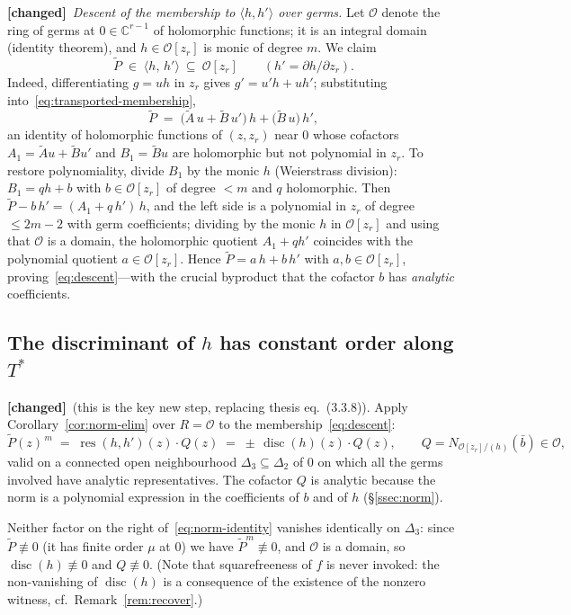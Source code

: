 \documentclass[11pt,a4paper]{article}
\theoremstyle{plain}
\theoremstyle{definition}
\newcommand{\C}{\mathbb{C}}
\DeclareMathOperator{\res}{res}
\DeclareMathOperator{\disc}{disc}
\newcommand{\ideal}[1]{\langle #1\rangle}
\newcommand{\OO}{\mathcal{O}}
\newcommand{\CHANGED}{\textbf{[changed]}}
\begin{document}
\CHANGED\ \emph{Descent of the membership to $\ideal{h,h'}$ over germs.} Let
$\OO$ denote the ring of germs at $0\in\C^{r-1}$ of holomorphic functions; it
is an integral domain (identity theorem), and $h\in\OO[z_r]$ is monic of
degree $m$. We claim
\begin{equation}\label{eq:descent}
  \widetilde P\;\in\;\ideal{h,\,h'}\ \subseteq\ \OO[z_r]
  \qquad(h'=\partial h/\partial z_r).
\end{equation}
Indeed, differentiating $g=uh$ in $z_r$ gives $g'=u'h+uh'$;
substituting into~\eqref{eq:transported-membership},
\[
  \widetilde P
  \;=\;\bigl(\widetilde A\,u+\widetilde B\,u'\bigr)\,h
      +\bigl(\widetilde B\,u\bigr)\,h' ,
\]
an identity of holomorphic functions of $(z,z_r)$ near $0$ whose cofactors
$A_1=\widetilde A u+\widetilde B u'$ and $B_1=\widetilde B u$ are holomorphic
but not polynomial in $z_r$. To restore polynomiality, divide $B_1$ by the
monic $h$ (Weierstrass division): $B_1=qh+b$ with $b\in\OO[z_r]$ of degree
$<m$ and $q$ holomorphic. Then
$\widetilde P-b\,h'=(A_1+q\,h')\,h$, and the left side is a polynomial in
$z_r$ of degree $\le 2m-2$ with germ coefficients; dividing by the monic $h$
in $\OO[z_r]$ and using that $\OO$ is a domain, the holomorphic quotient
$A_1+q h'$ coincides with the polynomial quotient $a\in\OO[z_r]$. Hence
$\widetilde P=a\,h+b\,h'$ with $a,b\in\OO[z_r]$,
proving~\eqref{eq:descent}---with the crucial byproduct that the cofactor $b$
has \emph{analytic} coefficients.

\subsection{The discriminant of $h$ has constant order along $T^*$}
\label{ssec:disc-order}

\CHANGED\ (this is the key new step, replacing thesis eq.~(3.3.8)).
Apply Corollary~\ref{cor:norm-elim} over $R=\OO$ to the
membership~\eqref{eq:descent}:
\begin{equation}\label{eq:norm-identity}
  \widetilde P(z)^{\,m}\;=\;\res(h,h')(z)\cdot Q(z)
  \;=\;\pm\,\disc(h)(z)\cdot Q(z),
  \qquad Q=N_{\OO[z_r]/(h)}(\bar b)\in\OO ,
\end{equation}
valid on a connected open neighbourhood $\Delta_3\subseteq\Delta_2$ of $0$ on
which all the germs involved have analytic representatives. The cofactor $Q$
is analytic because the norm is a polynomial expression in the coefficients of
$b$ and of $h$ (\S\ref{ssec:norm}).

Neither factor on the right of~\eqref{eq:norm-identity} vanishes identically
on $\Delta_3$: since $\widetilde P\not\equiv 0$ (it has finite order $\mu$ at
$0$) we have $\widetilde P^m\not\equiv0$, and $\OO$ is a domain, so
$\disc(h)\not\equiv0$ and $Q\not\equiv0$. (Note that squarefreeness of $f$ is
never invoked: the non-vanishing of $\disc(h)$ is a consequence of the
existence of the nonzero witness, cf.\ Remark~\ref{rem:recover}.)
\end{document}
